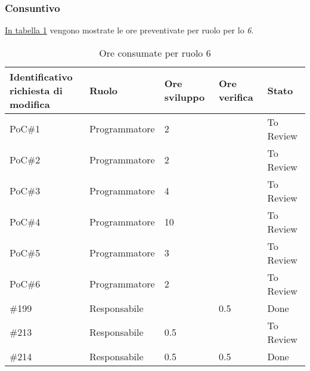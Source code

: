 \subsubsection{Consuntivo}
\hyperref[tab:sprint6_ore_consumate]{In tabella \ref{tab:sprint6_ore_consumate}} vengono mostrate le ore preventivate per ruolo per lo \textit{ 6}.

\begin{table}[H]
    \centering
    \begin{tabular}{| l | l | l | l | l |}
        \hline
            \makecell{\textbf{Identificativo} \\ \textbf{richiesta di modifica}} &
            \textbf{Ruolo} & 
            \textbf{Ore sviluppo} &
            \textbf{Ore verifica} & 
            \textbf{Stato}\\ 
        \hline
        PoC\#1 & Programmatore & 2 &  & To Review\\
        \hline
        PoC\#2 & Programmatore & 2 &  & To Review\\
        \hline
        PoC\#3 & Programmatore & 4 &  & To Review\\
        \hline
        PoC\#4 & Programmatore & 10 &  & To Review\\
        \hline
        PoC\#5 & Programmatore & 3 &  & To Review\\
        \hline
        PoC\#6 & Programmatore & 2 &  & To Review\\
        \hline
        \#199 & Responsabile &  & 0.5 & Done\\
        \hline
        \#213 & Responsabile & 0.5 &  & To Review\\
        \hline
        \#214 & Responsabile & 0.5 & 0.5 & Done\\
        \hline
    \end{tabular}
    \caption{Ore consumate per ruolo  6}
    \label{tab:sprint6_ore_consumate} 
\end{table}